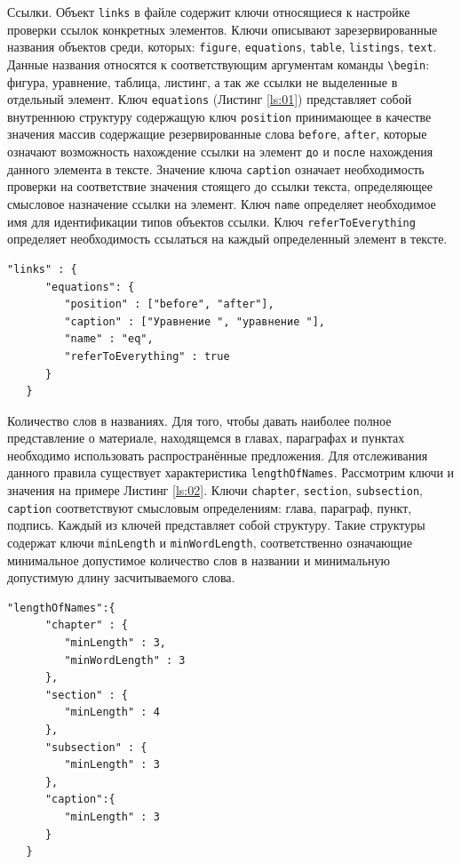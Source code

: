     Ссылки. Объект \verb|links| в файле содержит ключи относящиеся к настройке проверки ссылок конкретных элементов. Ключи описывают зарезервированные названия объектов среди, которых: \verb|figure|, \verb|equations|, \verb|table|, \verb|listings|, \verb|text|. Данные названия относятся к соответствующим аргументам команды \verb|\begin|: фигура, уравнение, таблица, листинг, а так же ссылки не выделенные в отдельный элемент. Ключ \verb|equations| (Листинг \ref{ls:01}) представляет собой внутреннюю структуру содержащую ключ \verb|position| принимающее в качестве значения массив содержащие резервированные слова \verb|before|, \verb|after|, которые означают возможность нахождение ссылки на элемент \verb|до| и \verb|после| нахождения данного элемента в тексте. Значение ключа \verb|caption| означает необходимость проверки на соответствие значения стоящего до ссылки текста, определяющее смысловое назначение ссылки на элемент. Ключ \verb|name| определяет необходимое имя для идентификации типов объектов ссылки. Ключ \verb|referToEverything| определяет необходимость ссылаться на каждый определенный элемент в тексте. 
    
    \begin{lstlisting}[caption = {Пример конфигурации ссылок}, label={ls:01}]
    "links" : {
      "equations": {
         "position" : ["before", "after"],  
         "caption" : ["Уравнение ", "уравнение "],
         "name" : "eq",
         "referToEverything" : true
      }
   }
    \end{lstlisting}

    Количество слов в названиях. Для того, чтобы давать наиболее полное представление о материале, находящемся в главах, параграфах и пунктах необходимо использовать распространённые предложения. Для отслеживания данного правила существует характеристика \verb|lengthOfNames|. Рассмотрим ключи и значения на примере Листинг \ref{ls:02}. Ключи \verb|chapter|, \verb|section|, \verb|subsection|, \verb|caption| соответствуют смысловым определениям: глава, параграф, пункт, подпись. Каждый из ключей представляет собой структуру. Такие структуры содержат ключи \verb|minLength| и \verb|minWordLength|, соответственно означающие минимальное допустимое количество слов в названии и минимальную допустимую длину засчитываемого слова.  
    
     \begin{lstlisting}[caption = {Пример конфигурации названий}, label={ls:02}]
    "lengthOfNames":{
      "chapter" : {
         "minLength" : 3,
         "minWordLength" : 3
      },
      "section" : {
         "minLength" : 4
      },
      "subsection" : {
         "minLength" : 3
      },
      "caption":{
         "minLength" : 3
      }
   }
    \end{lstlisting}

